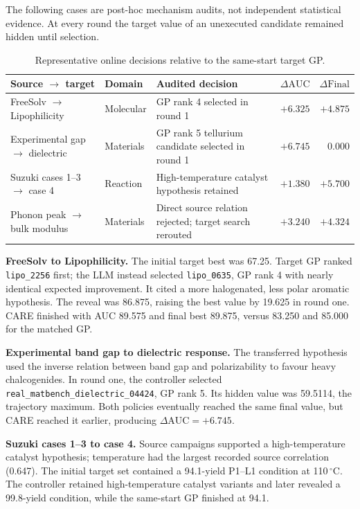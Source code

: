 \documentclass[pdflatex,sn-nature]{sn-jnl}
\newcommand{\dauc}{\Delta\mathrm{AUC}}
\newcommand{\dfinal}{\Delta\mathrm{Final}}
\newcommand{\code}[1]{\texttt{#1}}
\begin{document}
\begin{appendices}
The following cases are post-hoc mechanism audits, not independent statistical
evidence. At every round the target value of an unexecuted candidate remained
hidden until selection.

\begin{table}[t]
\centering
\caption{Representative online decisions relative to the same-start target GP.}
\label{tab:cases}
\begin{tabularx}{\textwidth}{p{3.4cm}p{2.4cm}X r r}
\toprule
Source $\rightarrow$ target & Domain & Audited decision & $\dauc$ & $\dfinal$ \\
\midrule
FreeSolv $\rightarrow$ Lipophilicity & Molecular & GP rank 4 selected in round 1 & $+6.325$ & $+4.875$ \\
Experimental gap $\rightarrow$ dielectric & Materials & GP rank 5 tellurium candidate selected in round 1 & $+6.745$ & $0.000$ \\
Suzuki cases 1--3 $\rightarrow$ case 4 & Reaction & High-temperature catalyst hypothesis retained & $+1.380$ & $+5.700$ \\
Phonon peak $\rightarrow$ bulk modulus & Materials & Direct source relation rejected; target search rerouted & $+3.240$ & $+4.324$ \\
\bottomrule
\end{tabularx}
\end{table}

\noindent\textbf{FreeSolv to Lipophilicity.}
The initial target best was 67.25. Target GP ranked \code{lipo\_2256} first;
the LLM instead selected \code{lipo\_0635}, GP rank 4 with nearly identical
expected improvement. It cited a more halogenated, less polar aromatic
hypothesis. The reveal was 86.875, raising the best value by 19.625 in round
one. CARE finished with AUC 89.575 and final best 89.875, versus 83.250 and
85.000 for the matched GP.

\noindent\textbf{Experimental band gap to dielectric response.}
The transferred hypothesis used the inverse relation between band gap and
polarizability to favour heavy chalcogenides. In round one, the controller
selected \code{real\_matbench\_dielectric\_04424}, GP rank 5. Its hidden value
was 59.5114, the trajectory maximum. Both policies eventually reached the same
final value, but CARE reached it earlier, producing $\dauc=+6.745$.

\noindent\textbf{Suzuki cases 1--3 to case 4.}
Source campaigns supported a high-temperature catalyst hypothesis; temperature
had the largest recorded source correlation (0.647). The initial target set
contained a 94.1-yield P1--L1 condition at 110\,$^\circ$C. The controller
retained high-temperature catalyst variants and later revealed a 99.8-yield
condition, while the same-start GP finished at 94.1.


\end{appendices}
\end{document}

